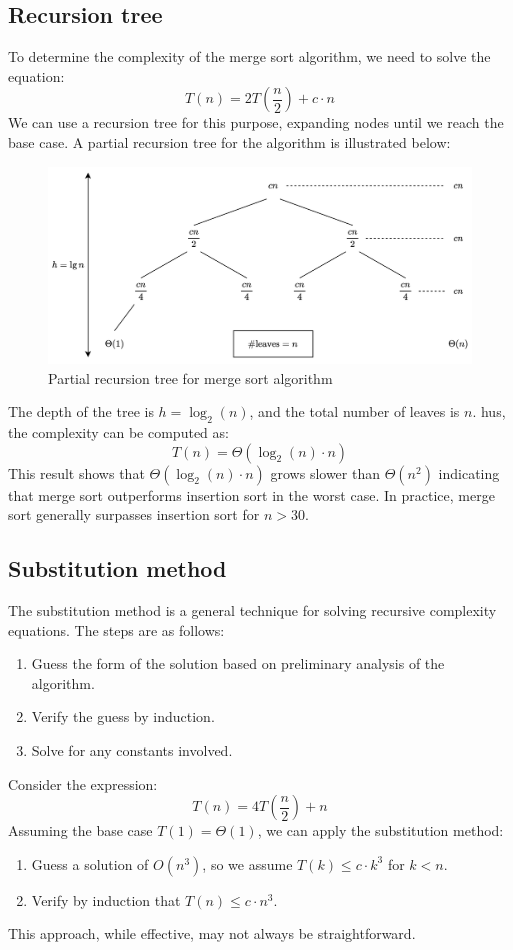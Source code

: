 \subsection{Recursion tree}
To determine the complexity of the merge sort algorithm, we need to solve the equation:
\[T(n)=2T\left(\frac{n}{2}\right)+c\cdot n\]
We can use a recursion tree for this purpose, expanding nodes until we reach the base case. 
A partial recursion tree for the algorithm is illustrated below:
\begin{figure}[H]
    \centering
    \includegraphics[width=0.75\linewidth]{images/tree.png}
    \caption{Partial recursion tree for merge sort algorithm}
\end{figure}
The depth of the tree is $h=\log_2(n)$, and the total number of leaves is $n$. 
hus, the complexity can be computed as:
\[T(n)=\Theta(\log_2(n)\cdot n)\]
This result shows that $\Theta(\log_2(n)\cdot n)$ grows slower than $\Theta(n^2)$  indicating that merge sort outperforms insertion sort in the worst case.
In practice, merge sort generally surpasses insertion sort for $n > 30$.

\subsection{Substitution method}
The substitution method is a general technique for solving recursive complexity equations. 
The steps are as follows:
\begin{enumerate}
    \item Guess the form of the solution based on preliminary analysis of the algorithm.
    \item Verify the guess by induction.
    \item Solve for any constants involved.
\end{enumerate}
\begin{example}
    Consider the expression:
    \[T(n)=4T\left(\frac{n}{2}\right)+n\]
    Assuming the base case $T(1)=\Theta(1)$, we can apply the substitution method:
    \begin{enumerate}
        \item Guess a solution of $O(n^3)$, so we assume $T(k)\leq c\cdot k^3$ for $k<n$. 
        \item Verify by induction that $T(n)\leq c\cdot n^3$. 
    \end{enumerate}
\end{example}
This approach, while effective, may not always be straightforward.

